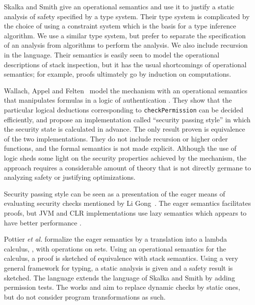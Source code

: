 \documentclass[submission,copyright,creativecommons]{eptcs}
\begin{document}
Skalka and Smith \cite{SkalkaS:ICFP00} give an operational semantics
and use it to justify a static analysis of safety specified by a type system.  
Their type system is complicated by the choice of using a constraint system
which is the basis for a type inference algorithm.  We use a similar type system, but 
prefer to separate the specification of an analysis from algorithms to perform the
analysis.  We also include recursion in the language.
Their semantics is easily seen to model the operational descriptions of stack
inspection, but it has the usual shortcomings of operational semantics; for example, proofs ultimately go by induction on computations. 


Wallach, Appel and Felten~\cite{WallachAF00} model the mechanism with
an operational semantics that manipulates formulas in a logic
of authentication \cite{AbadiBLP93}.  They show that the particular logical
deductions corresponding to \texttt{checkPermission} can be decided
efficiently, and propose an implementation called ``security passing
style'' in which the security state is calculated in advance.  The
only result proven is equivalence of the two implementations.  They do
not include recursion or higher order functions, and
the formal semantics is not made explicit.  Although the use of logic
sheds some light on the security properties achieved by the mechanism,
the approach requires a considerable amount of theory that is not
directly germane to analyzing safety or justifying optimizations.

Security passing style can be seen as a presentation of the eager
means of evaluating security checks mentioned by Li Gong~\cite{Gong99}.  
The eager semantics facilitates proofs, but JVM and CLR implementations
use lazy semantics which appears to have better performance \cite{Gong99,WallachAF00,LaMacchiaEtal02}.  

Pottier \emph{et al.} \cite{PottierSS05} formalize the eager semantics by a
translation into a lambda calculus, , with operations on sets.  Using an operational semantics for the
calculus, a proof is sketched of equivalence with stack semantics.  Using a very
general framework for typing, a static analysis is given and a safety
result is sketched.  The language extends the language of 
Skalka and Smith \cite{SkalkaS:ICFP00} by adding permission tests.
The works \cite{SkalkaS:ICFP00} and \cite{PottierSS05} aim to replace dynamic checks by static ones, 
but do not consider program transformations as such.
\end{document}
